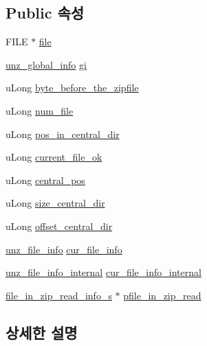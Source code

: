 \subsection*{Public 속성}
\begin{DoxyCompactItemize}
\item 
F\+I\+LE $\ast$ \mbox{\hyperlink{structunz__s_ae3672e9d6fcd9741941ed1ba376f86c7}{file}}
\item 
\mbox{\hyperlink{unzip_8h_a18c3b238618ea86ef503ecbd4092dbce}{unz\+\_\+global\+\_\+info}} \mbox{\hyperlink{structunz__s_a131303f89af11a26b53e99a58d6517cf}{gi}}
\item 
u\+Long \mbox{\hyperlink{structunz__s_a788688a8021cbbba6a2ac1765edd362e}{byte\+\_\+before\+\_\+the\+\_\+zipfile}}
\item 
u\+Long \mbox{\hyperlink{structunz__s_a737337b347bd5cc52bfabdcfbc11b853}{num\+\_\+file}}
\item 
u\+Long \mbox{\hyperlink{structunz__s_a70f2901a7ba85573aa280bad826baf4a}{pos\+\_\+in\+\_\+central\+\_\+dir}}
\item 
u\+Long \mbox{\hyperlink{structunz__s_abe2244ba62db8b3251634e26183f1c9a}{current\+\_\+file\+\_\+ok}}
\item 
u\+Long \mbox{\hyperlink{structunz__s_a2d8ae4c0975d2057e30b13c3148c27eb}{central\+\_\+pos}}
\item 
u\+Long \mbox{\hyperlink{structunz__s_a60b803a02e17ae46755cb94026ae973a}{size\+\_\+central\+\_\+dir}}
\item 
u\+Long \mbox{\hyperlink{structunz__s_ac6c37ef70549769fa59bca623565d78f}{offset\+\_\+central\+\_\+dir}}
\item 
\mbox{\hyperlink{unzip_8h_a03b3ec1a8745daa96699ac49f193b177}{unz\+\_\+file\+\_\+info}} \mbox{\hyperlink{structunz__s_ab1963897ac959ca0f9b4208c573c2795}{cur\+\_\+file\+\_\+info}}
\item 
\mbox{\hyperlink{unzip_8cpp_a8f7400cb2fdf408412d6f75accea8305}{unz\+\_\+file\+\_\+info\+\_\+internal}} \mbox{\hyperlink{structunz__s_a36625697385b9a675f02a446fa5ba583}{cur\+\_\+file\+\_\+info\+\_\+internal}}
\item 
\mbox{\hyperlink{structfile__in__zip__read__info__s}{file\+\_\+in\+\_\+zip\+\_\+read\+\_\+info\+\_\+s}} $\ast$ \mbox{\hyperlink{structunz__s_a7a5f0568475ad9a36ee2c1f3972406f0}{pfile\+\_\+in\+\_\+zip\+\_\+read}}
\end{DoxyCompactItemize}


\subsection{상세한 설명}


